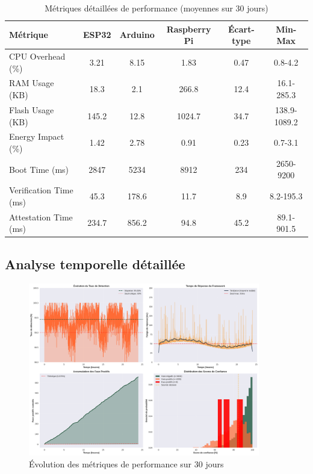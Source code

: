 \begin{table}[h]
\centering
\caption{Métriques détaillées de performance (moyennes sur 30 jours)}
\label{tab:detailed-performance}
\begin{tabular}{|l|c|c|c|c|c|}
\hline
\textbf{Métrique} & \textbf{ESP32} & \textbf{Arduino} & \textbf{Raspberry Pi} & \textbf{Écart-type} & \textbf{Min-Max} \\
\hline
CPU Overhead (\%) & 3.21 & 8.15 & 1.83 & 0.47 & 0.8-4.2 \\
RAM Usage (KB) & 18.3 & 2.1 & 266.8 & 12.4 & 16.1-285.3 \\
Flash Usage (KB) & 145.2 & 12.8 & 1024.7 & 34.7 & 138.9-1089.2 \\
Energy Impact (\%) & 1.42 & 2.78 & 0.91 & 0.23 & 0.7-3.1 \\
Boot Time (ms) & 2847 & 5234 & 8912 & 234 & 2650-9200 \\
Verification Time (ms) & 45.3 & 178.6 & 11.7 & 8.9 & 8.2-195.3 \\
Attestation Time (ms) & 234.7 & 856.2 & 94.8 & 45.2 & 89.1-901.5 \\
\hline
\end{tabular}
\end{table}

\subsection{Analyse temporelle détaillée}

\begin{figure}[h]
    \centering
    \includegraphics[width=0.9\textwidth]{assets/figures/detailed_performance_timeline.png}
    \caption{Évolution des métriques de performance sur 30 jours}
    \label{fig:detailed-performance-timeline}
\end{figure}

